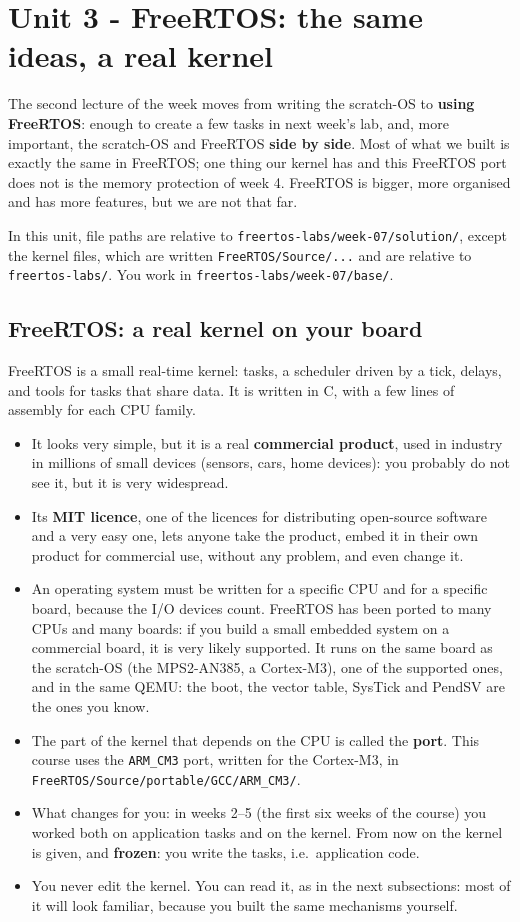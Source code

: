 \section{Unit 3 - FreeRTOS: the same ideas, a real kernel}
The second lecture of the week moves from writing the scratch-OS to \textbf{using FreeRTOS}: enough to create a few tasks in next week's lab, and, more important, the scratch-OS and FreeRTOS \textbf{side by side}. Most of what we built is exactly the same in FreeRTOS; one thing our kernel has and this FreeRTOS port does not is the memory protection of week 4. FreeRTOS is bigger, more organised and has more features, but we are not that far.

In this unit, file paths are relative to \texttt{freertos-labs/week-07/solution/}, except the kernel files, which are written \texttt{FreeRTOS/Source/...} and are relative to \texttt{freertos-labs/}. You work in \texttt{freertos-labs/week-07/base/}.

\subsection{FreeRTOS: a real kernel on your board}
FreeRTOS is a small real-time kernel: tasks, a scheduler driven by a tick, delays, and tools for tasks that share data. It is written in C, with a few lines of assembly for each CPU family.
\begin{itemize}
    \item It looks very simple, but it is a real \textbf{commercial product}, used in industry in millions of small devices (sensors, cars, home devices): you probably do not see it, but it is very widespread.
    \item Its \textbf{MIT licence}, one of the licences for distributing open-source software and a very easy one, lets anyone take the product, embed it in their own product for commercial use, without any problem, and even change it.
    \item An operating system must be written for a specific CPU and for a specific board, because the I/O devices count. FreeRTOS has been ported to many CPUs and many boards: if you build a small embedded system on a commercial board, it is very likely supported. It runs on the same board as the scratch-OS (the MPS2-AN385, a Cortex-M3), one of the supported ones, and in the same QEMU: the boot, the vector table, SysTick and PendSV are the ones you know.
    \item The part of the kernel that depends on the CPU is called the \textbf{port}. This course uses the \texttt{ARM\_CM3} port, written for the Cortex-M3, in \texttt{FreeRTOS/Source/portable/GCC/ARM\_CM3/}.
    \item What changes for you: in weeks 2--5 (the first six weeks of the course) you worked both on application tasks and on the kernel. From now on the kernel is given, and \textbf{frozen}: you write the tasks, i.e.\ application code.
    \item You never edit the kernel. You can read it, as in the next subsections: most of it will look familiar, because you built the same mechanisms yourself.
\end{itemize}

